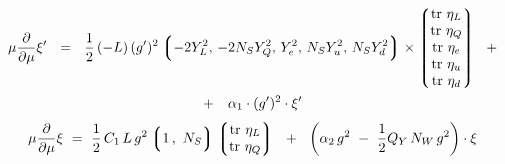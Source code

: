 \documentclass[12pt]{revtex4}
\newcommand{\p}{\partial}
\begin{document}
\begin{align}
\end{align}
%
\begin{multline}
\notag
	\mu \frac{\p}{\p\mu} 
	\xi' ~~=~~
	\frac{1}{2}\, ( - L )\, (g')^2 
	\left\lgroup
		-2 Y_L^2,\, -2 N_S Y_Q^2,\, Y_e^2,\, N_S Y_u^2,\, N_S Y_d^2
	\right\rgroup
	\times
	\left\lgroup
	\begin{matrix}
		{\rm tr~}\eta_L \\
		{\rm tr~}\eta_Q \\
		{\rm tr~}\eta_e \\	
		{\rm tr~}\eta_u \\
		{\rm tr~}\eta_d
	\end{matrix}
	\right\rgroup
	~~+
	\\
\notag
	+~~~
	\alpha_1\cdot (g')^2 \cdot \xi'
\end{multline}
%
\begin{equation}
\notag
	\mu \frac{\p}{\p\mu} 
	\xi 
	~=~
	\frac{1}{2}\, C_1\, L\, g^2 
	\left\lgroup 
	1\,,~ N_S
	\right\rgroup
	\left\lgroup
	\begin{matrix}
		{\rm tr~}\eta_L \\
		{\rm tr~}\eta_Q 
	\end{matrix}
	\right\rgroup
	~~+~~
	\left(
		\alpha_2\, g^2 
		~-~
		\frac{1}{2}
		Q_Y\, N_W\, g^2 
	\right)
	\cdot \xi
\end{equation}
\end{document}
